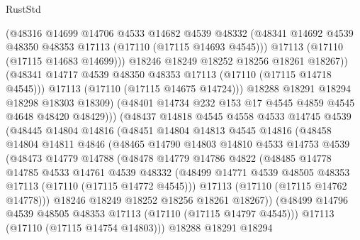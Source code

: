 \begin{lexlean}{RustStd}
\begin{coremodule}
                      (@48316
                        @14699
                        @14706
                        @4533
                        @14682
                        @4539
                        @48332
                        (@48341 @14692 @4539 @48350 @48353 @17113 (@17110 (@17115 @14693 @4545)))
                        @17113
                        (@17110 (@17115 @14683 @14699)))
                      @18246
                      @18249
                      @18252
                      @18256
                      @18261
                      @18267))
                  (@48341 @14717 @4539 @48350 @48353 @17113 (@17110 (@17115 @14718 @4545)))
                  @17113
                  (@17110 (@17115 @14675 @14724)))
                @18288
                @18291
                @18294
                @18298
                @18303
                @18309)
              (@48401 @14734 @232 @153 @17 @4545 @4859 @4545 @4648 @48420 @48429)))
          (@48437
            @14818
            @4545
            @4558
            @4533
            @14745
            @4539
            (@48445
              @14804
              @14816
              (@48451
                @14804
                @14813
                @4545
                @14816
                (@48458
                  @14804
                  @14811
                  @4846
                  (@48465
                    @14790
                    @14803
                    @14810
                    @4533
                    @14753
                    @4539
                    (@48473
                      @14779
                      @14788
                      (@48478
                        @14779
                        @14786
                        @4822
                        (@48485
                          @14778
                          @14785
                          @4533
                          @14761
                          @4539
                          @48332
                          (@48499 @14771 @4539 @48505 @48353 @17113 (@17110 (@17115 @14772 @4545)))
                          @17113
                          (@17110 (@17115 @14762 @14778)))
                        @18246
                        @18249
                        @18252
                        @18256
                        @18261
                        @18267))
                    (@48499 @14796 @4539 @48505 @48353 @17113 (@17110 (@17115 @14797 @4545)))
                    @17113
                    (@17110 (@17115 @14754 @14803)))
                  @18288
                  @18291
                  @18294

\end{coremodule}
\end{lexlean}
